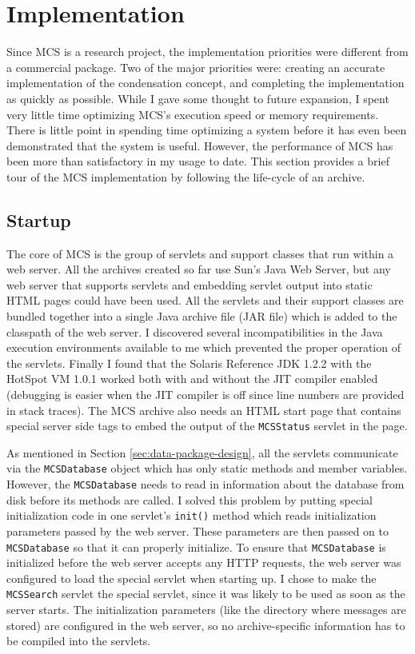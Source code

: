\section{Implementation}
Since MCS is a research project, the implementation priorities were different
from a commercial package. Two of the major priorities were: creating an
accurate implementation of the condensation concept, and completing the
implementation as quickly as possible. While I gave some thought to future
expansion, I spent very little time optimizing MCS's execution speed or memory
requirements. There is little point in spending time optimizing a system before
it has even been demonstrated that the system is useful. However, the
performance of MCS has been more than satisfactory in my usage to date. This
section provides a brief tour of the MCS implementation by following the
life-cycle of an archive.

\subsection{Startup}
The core of MCS is the group of servlets and support classes that run within a
web server. All the archives created so far use Sun's Java Web Server, but any
web server that supports servlets and embedding servlet output into static HTML
pages could have been used. All the servlets and their support classes are
bundled together into a single Java archive file (JAR file) which is added to
the classpath of the web server. I discovered several incompatibilities in the
Java execution environments available to me which prevented the proper
operation of the servlets. Finally I found that the Solaris Reference JDK 1.2.2
with the HotSpot VM 1.0.1 worked both with and without the JIT compiler enabled
(debugging is easier when the JIT compiler is off since line numbers are
provided in stack traces). The MCS archive also needs an HTML start page that
contains special server side tags to embed the output of the {\tt MCSStatus}
servlet in the page.

As mentioned in Section \ref{sec:data-package-design}, all the servlets
communicate via the {\tt MCSDatabase} object which has only static methods and
member variables. However, the {\tt MCSDatabase} needs to read in information
about the database from disk before its methods are called. I solved this
problem by putting special initialization code in one servlet's {\tt init()}
method which reads initialization parameters passed by the web server. These
parameters are then passed on to {\tt MCSDatabase} so that it can properly
initialize. To ensure that {\tt MCSDatabase} is initialized before the web
server accepts any HTTP requests, the web server was configured to load the
special servlet when starting up. I chose to make the {\tt MCSSearch} servlet
the special servlet, since it was likely to be used as soon as the server
starts. The initialization parameters (like the directory where messages are
stored) are configured in the web server, so no archive-specific information
has to be compiled into the servlets.

